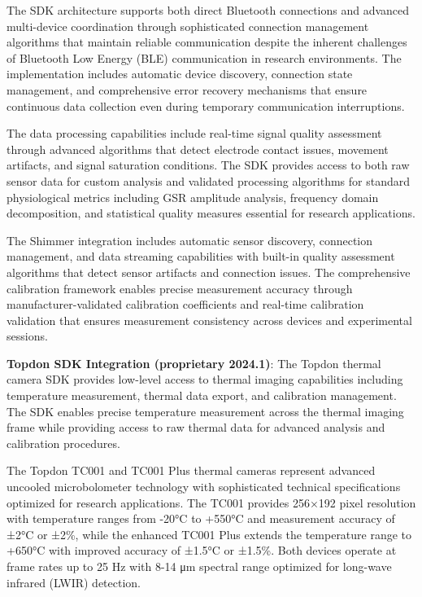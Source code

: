 \documentclass[11pt,a4paper]{report}
\begin{document}
The SDK architecture supports both direct Bluetooth connections and advanced multi-device coordination through
sophisticated connection management algorithms that maintain reliable communication despite the inherent challenges of
Bluetooth Low Energy (BLE) communication in research environments. The implementation includes automatic device
discovery, connection state management, and comprehensive error recovery mechanisms that ensure continuous data
collection even during temporary communication interruptions.

The data processing capabilities include real-time signal quality assessment through advanced algorithms that detect
electrode contact issues, movement artifacts, and signal saturation conditions. The SDK provides access to both raw
sensor data for custom analysis and validated processing algorithms for standard physiological metrics including GSR
amplitude analysis, frequency domain decomposition, and statistical quality measures essential for research
applications.

The Shimmer integration includes automatic sensor discovery, connection management, and data streaming capabilities with
built-in quality assessment algorithms that detect sensor artifacts and connection issues. The comprehensive calibration
framework enables precise measurement accuracy through manufacturer-validated calibration coefficients and real-time
calibration validation that ensures measurement consistency across devices and experimental sessions.

\textbf{Topdon SDK Integration (proprietary 2024.1)}: The Topdon thermal camera SDK provides low-level access to thermal
imaging capabilities including temperature measurement, thermal data export, and calibration management. The SDK enables
precise temperature measurement across the thermal imaging frame while providing access to raw thermal data for advanced
analysis and calibration procedures.

The Topdon TC001 and TC001 Plus thermal cameras represent advanced uncooled microbolometer technology with sophisticated
technical specifications optimized for research applications. The TC001 provides 256×192 pixel resolution with
temperature ranges from -20°C to +550°C and measurement accuracy of ±2°C or ±2\%, while the enhanced TC001 Plus extends
the temperature range to +650°C with improved accuracy of ±1.5°C or ±1.5\%. Both devices operate at frame rates up to 25
Hz with 8-14 μm spectral range optimized for long-wave infrared (LWIR) detection.
\end{document}
